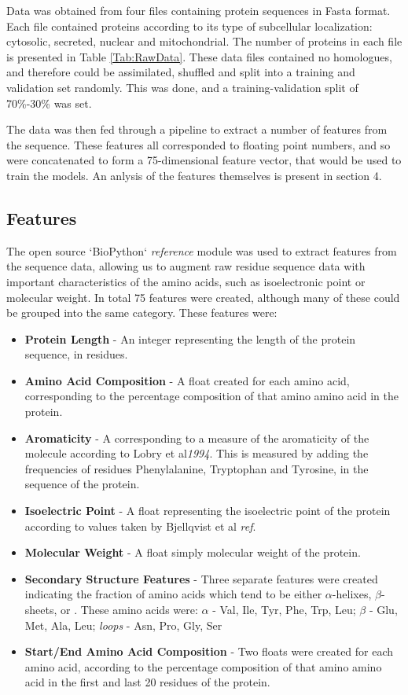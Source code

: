 \documentclass{bioinfo}
\begin{document}
Data was obtained from four files containing protein sequences in Fasta format. 
Each file contained proteins according to its type of subcellular localization: cytosolic, secreted, nuclear and mitochondrial. 
The number of proteins in each file is presented in Table \ref{Tab:RawData}. 
These data files contained no homologues, and therefore could be assimilated, shuffled and split into a training and validation set randomly. 
This was done, and a training-validation split of 70\%-30\% was set.

The data was then fed through a pipeline to extract a number of features from the sequence.
These features all corresponded to floating point numbers, and so were concatenated to form a 75-dimensional feature vector, that would be used to train the models. 
An anlysis of the features themselves is present in section 4. 


\subsection{Features}

The open source `BioPython` \textit{reference} module was used to extract features from the sequence data, allowing us to augment raw residue sequence data with important characteristics of the amino acids, such as isoelectronic point or molecular weight. In total 75 features were created, although many of these could be grouped into the same category. These features were:

\begin{itemize}


\item{ \textbf{Protein Length} } - An integer representing the length of the protein sequence, in residues.
\item{ \textbf{Amino Acid Composition} } - A float created for each amino acid, corresponding to the percentage composition of that amino amino acid in the protein.
\item{ \textbf{Aromaticity}} - A corresponding to a measure of the aromaticity of the molecule according to Lobry et al\textit{1994}. This is measured by adding the frequencies of residues Phenylalanine, Tryptophan and Tyrosine, in the sequence of the protein.
\item{ \textbf{Isoelectric Point}} - A float representing the isoelectric point of the protein according to values taken by Bjellqvist et al \textit{ref}.
\item{ \textbf{Molecular Weight}} - A float simply molecular weight of the protein. 
\item{ \textbf{Secondary Structure Features}} - Three separate features were created indicating the fraction of amino acids which tend to be either $\alpha$-helixes, $\beta$-sheets, or . These amino acids were: $\alpha$ - Val, Ile, Tyr, Phe, Trp, Leu;   $\beta$ - Glu, Met, Ala, Leu; \textit{loops} -  Asn, Pro, Gly, Ser
\item{ \textbf{Start/End Amino Acid Composition} - Two floats were created for each amino acid, according to the percentage composition of that amino amino acid in the first and last 20 residues of the protein.}

\end{itemize}
\end{document}
